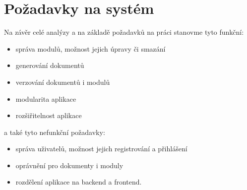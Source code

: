 \section{Požadavky na systém}

Na závěr celé analýzy a na základě požadavků na práci stanovme tyto funkční:
\begin{itemize}
    \item správa modulů, možnost jejich úpravy či smazání
    \item generování dokumentů
    \item verzování dokumentů i modulů
    \item modularita aplikace
    \item rozšiřitelnost aplikace
\end{itemize}
a také tyto nefunkční požadavky:
\begin{itemize}
    \item správa uživatelů, možnost jejich registrování a přihlášení
    \item oprávnění pro dokumenty i moduly
    \item rozdělení aplikace na backend a frontend.
\end{itemize}
